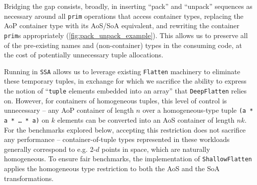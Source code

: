 
Bridging the gap consists, broadly, in inserting ``pack'' and ``unpack''
sequences as necessary around all \texttt{prim} operations that access container
types, replacing the AoP container type with its AoS/SoA equivalent, and
rewriting the container \texttt{prim}s appropriately
(\cref{fig:pack_unpack_example}). This allows us to preserve all of the
pre-existing names and (non-container) types in the consuming code, at the cost
of potentially unnecessary tuple allocations.


Running in \texttt{SSA} allows us to leverage existing \texttt{Flatten}
machinery to eliminate these temporary tuples, in exchange for which we
sacrifice the ability to express the notion of ``\texttt{tuple} elements
embedded into an array'' that \texttt{DeepFlatten} relies on. However, for
containers of homogeneous tuples, this level of control is unnecessary -- any
AoP container of length $n$ over a homogeneous-type tuple \texttt{(a * a * \dots
* a)} on $k$ elements can be converted into an AoS container of length $nk$. For
the benchmarks explored below, accepting this restriction does not sacrifice any
performance -- container-of-tuple types represented in these workloads generally
correspond to e.g. 2-$d$ points in space, which are naturally homogeneous. To
ensure fair benchmarks, the implementation of \texttt{ShallowFlatten} applies
the homogeneous type restriction to both the AoS and the SoA transformations.



